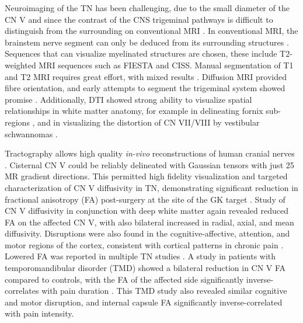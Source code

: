 Neuroimaging of the TN has been challenging, due to the small diameter of the CN V and since the contrast of the CNS trigeminal pathways is difficult to distinguish from the surrounding on conventional MRI \cite{Borges2010}. In conventional MRI, the brainstem nerve segment can only be deduced from its surrounding structures \cite{Casselman2008}. Sequences that can visualize myelinated structures are chosen, these include T2-weighted MRI  sequences such as FIESTA and CISS. Manual segmentation of T1 and T2 MRI requires great effort, with mixed results \cite{Miller2008a}. Diffusion MRI provided fibre orientation, and early attempts to segment the trigeminal system showed promise \cite{Upadhyay2008,Habas2007f}. Additionally, DTI showed strong ability to visualize spatial relationships in white matter anatomy, for example in delineating fornix sub-regions \cite{Chen2015c}, and in visualizing the distortion of CN VII/VIII by vestibular schwannomas \cite{Chen2011b}.  

Tractography allows high quality \textit{in-vivo} reconstructions of human cranial nerves \cite{Hodaie2010}. Cisternal CN V could be reliably delineated with Gaussian tensors with just 25 MR gradient directions. This permitted high fidelity visualization and targeted characterization of CN V diffusivity in TN, demonstrating significant reduction in fractional anisotropy (FA) post-surgery at the site of the GK target \cite{Hodaie2009a}. Study of CN V diffusivity in conjunction with deep white matter again revealed reduced FA on the affected CN V, with also bilateral increased in radial, axial, and mean diffusivity. Disruptions were also found in the cognitive-affective, attention, and motor regions of the cortex, consistent with cortical patterns in chronic pain \cite{Desouza2013}. Lowered FA was reported in multiple TN studies \cite{Herweh2007, Lutz2011}. A study in patients with temporomandibular disorder (TMD) showed a bilateral reduction in CN V FA compared to controls, with the FA of the affected side significantly inverse-correlates with pain duration \cite{Moayedi2012}. This TMD study also revealed similar cognitive and motor disruption, and internal capsule FA significantly inverse-correlated with pain intensity. 